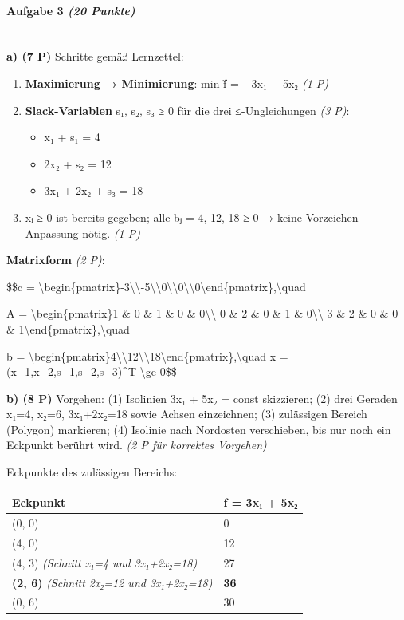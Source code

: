 \documentclass[11pt, a4paper]{article}
\begin{document}
\paragraph{Aufgabe 3 \textit{(20 Punkte)}}\mbox{}\\[2pt]

\textbf{a) (7 P)} Schritte gemäß Lernzettel:

\begin{enumerate}
  \item \textbf{Maximierung → Minimierung}: min f̃ = −3x₁ − 5x₂ \textit{(1 P)}
  \item \textbf{Slack-Variablen} s₁, s₂, s₃ ≥ 0 für die drei ≤-Ungleichungen \textit{(3 P)}:
\begin{itemize}
  \item x₁ + s₁ = 4
  \item 2x₂ + s₂ = 12
  \item 3x₁ + 2x₂ + s₃ = 18
\end{itemize}
  \item xᵢ ≥ 0 ist bereits gegeben; alle bⱼ = 4, 12, 18 ≥ 0 → keine Vorzeichen-Anpassung nötig. \textit{(1 P)}
\end{enumerate}

\textbf{Matrixform} \textit{(2 P)}:


\$\$c = \textbackslash{}begin\{pmatrix\}-3\textbackslash{}\textbackslash{}-5\textbackslash{}\textbackslash{}0\textbackslash{}\textbackslash{}0\textbackslash{}\textbackslash{}0\textbackslash{}end\{pmatrix\},\textbackslash{}quad

A = \textbackslash{}begin\{pmatrix\}1 \& 0 \& 1 \& 0 \& 0\textbackslash{}\textbackslash{} 0 \& 2 \& 0 \& 1 \& 0\textbackslash{}\textbackslash{} 3 \& 2 \& 0 \& 0 \& 1\textbackslash{}end\{pmatrix\},\textbackslash{}quad

b = \textbackslash{}begin\{pmatrix\}4\textbackslash{}\textbackslash{}12\textbackslash{}\textbackslash{}18\textbackslash{}end\{pmatrix\},\textbackslash{}quad x = (x\_1,x\_2,s\_1,s\_2,s\_3)\textasciicircum{}T \textbackslash{}ge 0\$\$


\textbf{b) (8 P)} Vorgehen: (1) Isolinien 3x₁ + 5x₂ = const skizzieren; (2) drei Geraden x₁=4, x₂=6, 3x₁+2x₂=18 sowie Achsen einzeichnen; (3) zulässigen Bereich (Polygon) markieren; (4) Isolinie nach Nordosten verschieben, bis nur noch ein Eckpunkt berührt wird. \textit{(2 P für korrektes Vorgehen)}


Eckpunkte des zulässigen Bereichs:



{\small
\begin{tabularx}{\linewidth}{XX}
\hline
\rowcolor{tableheadbg}
{\color{white}\textbf{Eckpunkt}} & {\color{white}\textbf{f = 3x₁ + 5x₂}} \\[2pt]
\hline
\endhead
\hline
\endfoot
(0, 0) & 0 \\
(4, 0) & 12 \\
(4, 3)  \textit{(Schnitt x₁=4 und 3x₁+2x₂=18)} & 27 \\
\textbf{(2, 6)} \textit{(Schnitt 2x₂=12 und 3x₁+2x₂=18)} & \textbf{36} \\
(0, 6) & 30 \\
\end{tabularx}
}
\end{document}
